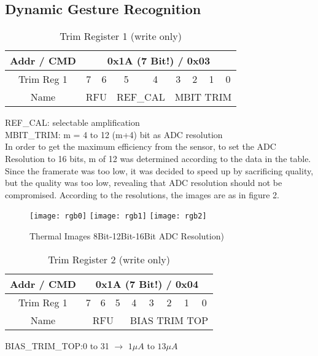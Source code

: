 \documentclass[thesis]{deutez}
\begin{document}
\subsection{Dynamic Gesture Recognition}

\begin{table}[h!]
	\begin{center}
		\caption{Trim Register 1 (write only)\cite{datasheet}}
		\begin{tabular}{|c|c|c|c|c|c|c|c|c|}
			\hline
			Addr / CMD & \multicolumn{8}{c|}{0x1A (7 Bit!) / 0x03} \\
			\hline
			Trim Reg 1 & 7 & 6 &5  &4  &3  &2  &1&0  \\
			\hline
			Name & \multicolumn{2}{c|}{RFU} & \multicolumn{2}{c|}{REF\_CAL}& \multicolumn{4}{c|}{MBIT TRIM}\\
			\hline
		\end{tabular}
	\end{center}
\end{table}
\FloatBarrier

REF\_CAL: selectable amplification
\\

MBIT\_TRIM: m = 4 to 12 (m+4) bit as ADC resolution\\

In order to get the maximum efficiency from the sensor, to set the ADC Resolution to 16 bits, m of 12 was determined according to the data in the table. Since the framerate was too low, it was decided to speed up by sacrificing quality, but the quality was too low, revealing that ADC resolution should not be compromised. According to the resolutions, the images are as in figure 2.\\
\begin{figure}[h!]
	\centering
	\texttt{[image: rgb0]}
	\texttt{[image: rgb1]}
	\texttt{[image: rgb2]}
	\caption{Thermal Images 8Bit-12Bit-16Bit ADC Resolution)}
\end{figure}
\begin{table}[h!]
	\begin{center}
		\caption{Trim Register 2 (write only)\cite{datasheet}}
\begin{tabular}{|c|c|c|c|c|c|c|c|c|}
	\hline
	Addr / CMD & \multicolumn{8}{c|}{0x1A (7 Bit!) / 0x04} \\
	\hline
	Trim Reg 1 & 7 & 6 &5  &4  &3  &2  &1&0  \\
	\hline
	Name & \multicolumn{3}{c|}{RFU} & \multicolumn{5}{c|}{BIAS TRIM TOP}\\
	\hline
\end{tabular}
	\end{center}
\end{table}
\FloatBarrier
BIAS\_TRIM\_TOP:0 to 31 $ \longrightarrow $ $ 1\mu A $ to $ 13 \mu A $\\
\end{document}
